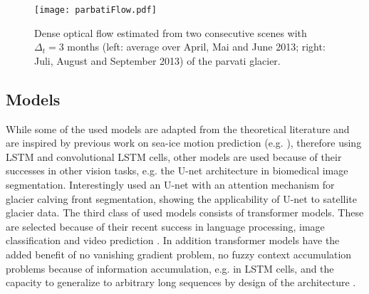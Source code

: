 \documentclass[12pt]{article}
\begin{document}
	
	
		
		
		
\begin{figure}[h]
	
	\centering
	\texttt{[image: parbatiFlow.pdf]}\hfill
	
	\caption{Dense optical flow estimated from two consecutive scenes with $\Delta_t = 3$ months (left: average over April, Mai and June 2013; right: Juli, August and September 2013) of the parvati glacier.}
	\label{fig:figure3}
	
\end{figure} 

\subsection{Models}
While some of the used models are adapted from the theoretical literature and are inspired by previous work on sea-ice motion prediction (e.g. \citet{petrou2019prediction, petrou2017prediction}), therefore using LSTM and convolutional LSTM cells, other models are used because of their successes in other vision tasks, e.g. the U-net architecture \citep{ronneberger2015u} in biomedical image segmentation. Interestingly \citet{holzmann2021glacier} used an U-net with an attention mechanism for glacier calving front segmentation, showing the applicability of U-net to satellite glacier data. The third class of used models consists of transformer models. These are selected because of their recent success in language processing, image classification and video prediction \citep{khan2022transformers}. In addition transformer models have the added benefit of no vanishing gradient problem, no fuzzy context accumulation problems because of information accumulation, e.g. in LSTM cells, and the capacity to generalize to arbitrary long sequences by design of the architecture \citep{vaswani2017attention}. 
\end{document}
